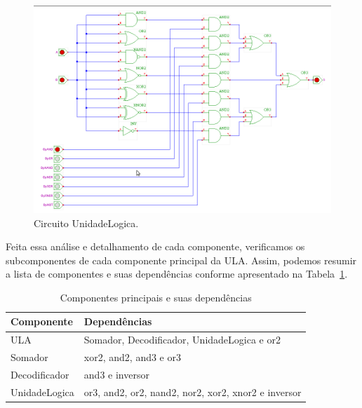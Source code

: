 \documentclass[a4paper,10pt]{report}
\begin{document}
\begin{figure}[H]
\centering
\includegraphics[width=1\textwidth]{figuras/unidadeLogica.png}
\caption{Circuito UnidadeLogica.}
\label{fig:UnidadeLogica}
\end{figure}

Feita essa análise e detalhamento de cada componente, verificamos os subcomponentes de cada componente principal da ULA. Assim, podemos resumir a lista de componentes e suas dependências conforme apresentado na Tabela~\ref{tab:dep_componentes}.

\begin{table}[H]
\centering
\caption{Componentes principais e suas dependências} %
\begin{tabular}{ll} %
\hline %
Componente & Dependências \\ %
\hline
\hline
ULA & Somador, Decodificador, UnidadeLogica e or2 \\
Somador & xor2, and2, and3 e or3 \\
Decodificador & and3 e inversor \\
UnidadeLogica & or3, and2, or2, nand2, nor2, xor2, xnor2 e inversor \\
\hline
\end{tabular}
\label{tab:dep_componentes}
\end{table} 
\end{document}

